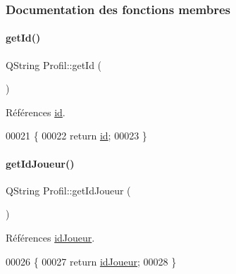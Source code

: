 \subsubsection{Documentation des fonctions membres}
\mbox{\label{class_profil_aa51afb45d2062ef33145b21952e7d32a}} 
\paragraph{\texorpdfstring{get\+Id()}{getId()}}
{\footnotesize\ttfamily Q\+String Profil\+::get\+Id (\begin{DoxyParamCaption}{ }\end{DoxyParamCaption})}



Références \hyperlink{class_profil_ac2a62326a3156d5e67011d3dcc063e40}{id}.


\begin{DoxyCode}
00021 \{
00022     \textcolor{keywordflow}{return} \hyperlink{class_profil_ac2a62326a3156d5e67011d3dcc063e40}{id};
00023 \}
\end{DoxyCode}
\mbox{\label{class_profil_aa54d7307013204c361643f019bb924a9}} 
\paragraph{\texorpdfstring{get\+Id\+Joueur()}{getIdJoueur()}}
{\footnotesize\ttfamily Q\+String Profil\+::get\+Id\+Joueur (\begin{DoxyParamCaption}{ }\end{DoxyParamCaption})}



Références \hyperlink{class_profil_a0d8277364c321a3797f91e3c32dbe47f}{id\+Joueur}.


\begin{DoxyCode}
00026 \{
00027     \textcolor{keywordflow}{return} \hyperlink{class_profil_a0d8277364c321a3797f91e3c32dbe47f}{idJoueur};
00028 \}
\end{DoxyCode}
\mbox{\label{class_profil_a806de0fed3f11021eb5294b93efd721d}} 
